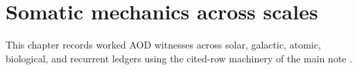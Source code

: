 \section{Somatic mechanics across scales}

This chapter records worked AOD witnesses across solar, galactic, atomic, biological, and recurrent ledgers using the cited-row machinery of the main note \cite{aod43_main_2026}.

